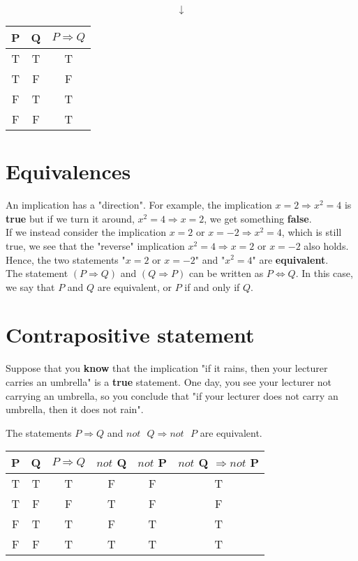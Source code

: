 \documentclass[11pt]{article}
\begin{document}
\[\downarrow\]

\begin{center}
\begin{tabular}{ |c|c|c| }
\hline
P & Q & $P \Rightarrow Q$ \\
\hline
T & T & T \\
\hline
T & F & F \\
\hline
F & T & T \\
\hline
F & F & T \\
\hline
\end{tabular}
\end{center}


\section{Equivalences}
\label{sec:orgf0186f1}
An implication has a "direction". For example, the implication \(x = 2 \Rightarrow x^2 = 4\) is \textbf{true} but if we turn it around, \(x^2 = 4 \Rightarrow x = 2\), we get something \textbf{false}.
\\[0pt]

If we instead consider the implication \(x = 2 \text{ or } x = -2 \Rightarrow x^2 = 4\), which is still true, we see that the "reverse" implication \(x^2 = 4 \Rightarrow x = 2 \text{ or } x = -2\) also holds. Hence, the two statements "\(x = 2 \text{ or } x = -2\)" and "\(x^2 = 4\)" are \textbf{equivalent}.
\\[0pt]

The statement \((P \Rightarrow Q)\) and \((Q \Rightarrow P)\) can be written as \(P \Leftrightarrow Q\). In this case, we say that \(P\) and \(Q\) are equivalent, or \(P\) if and only if \(Q\).

\newpage


\section{Contrapositive statement}
\label{sec:org62222e0}
Suppose that you \textbf{know} that the implication "if it rains, then your lecturer carries an umbrella" is a \textbf{true} statement. One day, you see your lecturer not carrying an umbrella, so you conclude that "if your lecturer does not carry an umbrella, then it does not rain".

The statements \(P \Rightarrow Q\) and \(not \text{ } Q \Rightarrow not \text{ } P\) are equivalent.

\begin{center}
\begin{tabular}{ |c|c|c|c|c|c| }
\hline
P & Q & $P \Rightarrow Q$ & $not$ Q & $not$ P & $not$ Q $\Rightarrow not$ P \\
\hline
T & T & T & F & F & T\\
\hline
T & F & F & T & F & F \\
\hline
F & T & T & F & T & T \\
\hline
F & F & T & T & T & T \\
\hline
\end{tabular}
\end{center}
\end{document}
